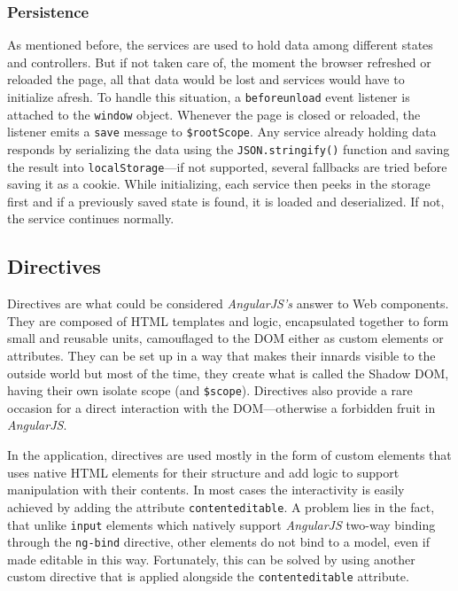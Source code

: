 \documentclass[thesis=M,english,hidelinks]{FITthesis}[2012/10/20]
\newcommand{\code}{\texttt}
\begin{document}
    \subsubsection{Persistence}

As mentioned before, the services are used to hold data among different states and controllers. But if not taken care of, the moment the browser refreshed or reloaded the page, all that data would be lost and services would have to initialize afresh. To handle this situation, a \code{beforeunload} event listener is attached to the \code{window} object. Whenever the page is closed or reloaded, the listener emits a \code{save} message to \code{\$rootScope}. Any service already holding data responds by serializing the data using the \code{JSON.stringify()} function and saving the result into \code{localStorage}---if not supported, several fallbacks are tried before saving it as a cookie. While initializing, each service then peeks in the storage first and if a previously saved state is found, it is loaded and deserialized. If not, the service continues normally.

  \subsection{Directives}

Directives are what could be considered \textit{AngularJS's} answer to Web components. They are composed of HTML templates and logic, encapsulated together to form small and reusable units, camouflaged to the DOM either as custom elements or attributes. They can be set up in a way that makes their innards visible to the outside world but most of the time, they create what is called the Shadow DOM, having their own isolate scope (and \code{\$scope}). Directives also provide a rare occasion for a direct interaction with the DOM---otherwise a forbidden fruit in \textit{AngularJS}.

In the application, directives are used mostly in the form of custom elements that uses native HTML elements for their structure and add logic to support manipulation with their contents. In most cases the interactivity is easily achieved by adding the attribute \code{contenteditable}. A problem lies in the fact, that unlike \code{input} elements which natively support \textit{AngularJS} two-way binding through the \code{ng-bind} directive, other elements do not bind to a model, even if made editable in this way. Fortunately, this can be solved by using another custom directive that is applied alongside the \code{contenteditable} attribute.
\end{document}
